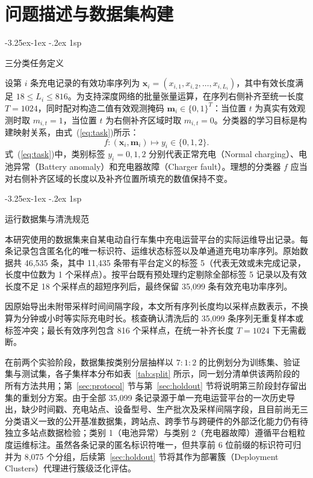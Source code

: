 \documentclass[12pt]{iopjournal}
\makeatletter
\renewcommand\subsection{\@startsection{subsection}{2}{\z@}%
                   {-3.25ex\@plus -1ex \@minus -.2ex}%
                   {1sp}%
                   {\reset@font\normalsize\bfseries\raggedright}}
\makeatother
\begin{document}
\section{问题描述与数据集构建}\label{sec:data}

\subsection{三分类任务定义}

设第 $i$ 条充电记录的有效功率序列为 $\bm{x}_i=(x_{i,1},x_{i,2},\ldots,x_{i,L_i})$，其中有效长度满足 $18\le L_i\le 816$。为支持深度网络的批量张量运算，在序列右侧补齐至统一长度 $T=1024$，同时配对构造二值有效观测掩码 $\bm{m}_i\in\{0,1\}^T$：当位置 $t$ 为真实有效观测时取 $m_{i,t}=1$，当位置 $t$ 为右侧补齐区域时取 $m_{i,t}=0$。分类器的学习目标是构建映射关系，由式~(\ref{eq:task})所示：
\begin{equation}
f:(\bm{x}_i,\bm{m}_i)\mapsto y_i\in\{0,1,2\}.
\label{eq:task}
\end{equation}
式~(\ref{eq:task})中，类别标签 $y_i=0,1,2$ 分别代表正常充电（Normal charging）、电池异常（Battery anomaly）和充电器故障（Charger fault）。理想的分类器 $f$ 应当对右侧补齐区域的长度以及补齐位置所填充的数值保持不变。

\subsection{运行数据集与清洗规范}\label{sec:dataset}

本研究使用的数据集来自某电动自行车集中充电运营平台的实际运维导出记录。每条记录包含匿名化的唯一标识符、运维状态标签以及单通道充电功率序列。原始数据共 46,535 条，其中 11,435 条带有平台定义的标签 5（代表无效或未完成记录，长度中位数为 1 个采样点）。按平台既有预处理约定剔除全部标签 5 记录以及有效长度不足 18 个采样点的超短序列后，最终保留 35,099 条有效充电功率序列。

因原始导出未附带采样时间间隔字段，本文所有序列长度均以采样点数表示，不换算为分钟或小时等实际充电时长。核查确认清洗后的 35,099 条序列无重复样本或标签冲突；最长有效序列包含 816 个采样点，在统一补齐长度 $T=1024$ 下无需截断。

在前两个实验阶段，数据集按类别分层抽样以 $7:1:2$ 的比例划分为训练集、验证集与测试集，各子集样本分布如表~\ref{tab:split} 所示，同一划分清单供该两阶段的所有方法共用；第~\ref{sec:protocol} 节与第~\ref{sec:holdout} 节将说明第三阶段封存留出集的重划分方案。由于全部 35,099 条记录源于单一充电运营平台的一次历史导出，缺少时间戳、充电站点、设备型号、生产批次及采样间隔字段，且目前尚无三分类语义一致的公开基准数据集，跨站点、跨季节与跨硬件的外部泛化能力仍有待独立多站点数据检验；类别 1（电池异常）与类别 2（充电器故障）遵循平台粗粒度运维标注。虽然各条记录的匿名标识符唯一，但共享前 6 位前缀的标识符可归并为 8,075 个分组，后续第~\ref{sec:holdout} 节将其作为部署簇（Deployment Clusters）代理进行簇级泛化评估。
\end{document}
